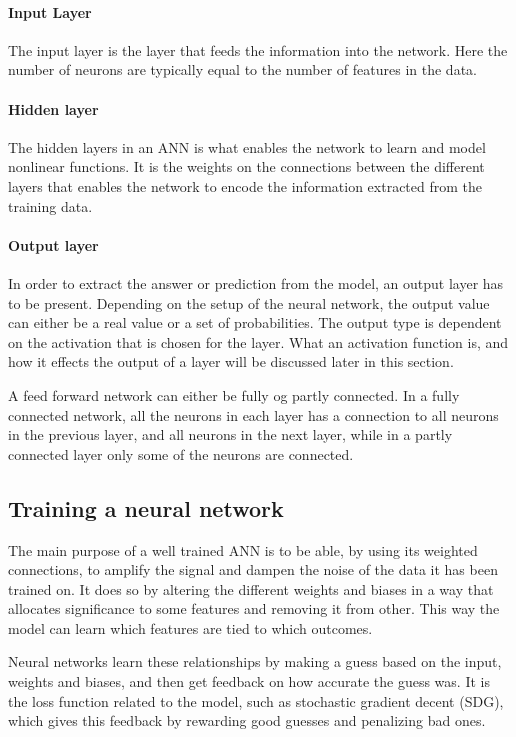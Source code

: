 \paragraph{Input Layer}
The input layer is the layer that feeds the information into the network. Here the number of neurons are typically equal to the number of features in the data.

\paragraph{Hidden layer}
The hidden layers in an ANN is what enables the network to learn and model nonlinear functions. It is the weights on the connections between the different layers that enables the network to encode the information extracted from the training data.

\paragraph{Output layer}
In order to extract the answer or prediction from the model, an output layer has to be present. Depending on the setup of the neural network, the output value can either be a real value or a set of probabilities. The output type is dependent on the activation that is chosen for the layer. What an activation function is, and how it effects the output of a layer will be discussed later in this section.

A feed forward network can either be fully og partly connected. In a fully connected network, all the neurons in each layer has a connection to all neurons in the previous layer, and all neurons in the next layer, while in a partly connected layer only some of the neurons are connected.

\subsection{Training a neural network}
The main purpose of a well trained ANN is to be able, by using its weighted connections, to amplify the signal and dampen the noise of the data it has been trained on. It does so by altering the different weights and biases in a way that allocates significance to some features and removing it from other. This way the model can learn which features are tied to which outcomes.

Neural networks learn these relationships by making a guess based on the input, weights and biases, and then get feedback on how accurate the guess was. It is the loss function related to the model, such as stochastic gradient decent (SDG), which gives this feedback by rewarding good guesses and penalizing bad ones.

